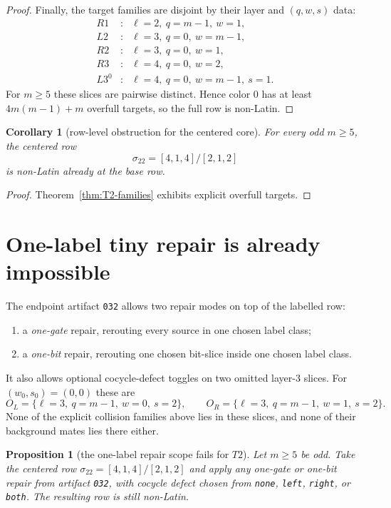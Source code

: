 \documentclass[11pt]{article}
\newtheorem{proposition}[theorem]{Proposition}
\newtheorem{corollary}[theorem]{Corollary}
\begin{document}
\begin{proof}
\smallskip
Finally, the target families are disjoint by their layer and $(q,w,s)$ data:
\[
\begin{array}{rcl}
R1&:& \ell=2,\ q=m-1,\ w=1,\\
L2&:& \ell=3,\ q=0,\ w=m-1,\\
R2&:& \ell=3,\ q=0,\ w=1,\\
R3&:& \ell=4,\ q=0,\ w=2,\\
L3^0&:& \ell=4,\ q=0,\ w=m-1,\ s=1.
\end{array}
\]
For $m\ge 5$ these slices are pairwise distinct.
Hence color $0$ has at least $4m(m-1)+m$ overfull targets, so the full row is
non-Latin.
\end{proof}

\begin{corollary}[row-level obstruction for the centered core]
For every odd $m\ge 5$, the centered row
\[
\sigma_{22}=[4,1,4]/[2,1,2]
\]
is non-Latin already at the base row.
\end{corollary}

\begin{proof}
Theorem~\ref{thm:T2-families} exhibits explicit overfull targets.
\end{proof}

\section*{One-label tiny repair is already impossible}

The endpoint artifact \texttt{032} allows two repair modes on top of the labelled
row:
\begin{enumerate}
\item a \emph{one-gate} repair, rerouting every source in one chosen label class;
\item a \emph{one-bit} repair, rerouting one chosen bit-slice inside one chosen
      label class.
\end{enumerate}
It also allows optional cocycle-defect toggles on two omitted layer-$3$ slices.
For $(w_0,s_0)=(0,0)$ these are
\[
O_L=\{\ell=3,\ q=m-1,\ w=0,\ s=2\},
\qquad
O_R=\{\ell=3,\ q=m-1,\ w=1,\ s=2\}.
\]
None of the explicit collision families above lies in these slices, and none of
their background mates lies there either.

\begin{proposition}[the one-label repair scope fails for $T2$]
\label{prop:T2-one-label-fails}
Let $m\ge 5$ be odd.
Take the centered row $\sigma_{22}=[4,1,4]/[2,1,2]$ and apply any one-gate or
one-bit repair from artifact \texttt{032}, with cocycle defect chosen from
\texttt{none}, \texttt{left}, \texttt{right}, or \texttt{both}.
The resulting row is still non-Latin.
\end{proposition}
\end{document}
